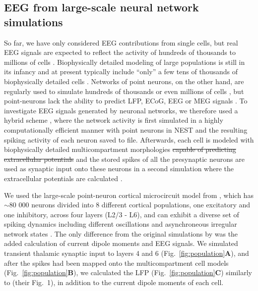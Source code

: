 \documentclass[preprint,10pt,authoryear]{elsarticle}
\newcommand{\tvntxt}[1]{{\color{Emerald}#1}}
\newcommand{\gex}[1]{{\color{Orange}#1}}
\begin{document}
\subsection{\tvntxt{EEG from large-scale neural network simulations}}
\label{subsec:populations}
So far, we have only considered EEG contributions from single cells, but real EEG signals are expected to reflect the activity of hundreds of thousands to millions of cells \citep{NUNEZ2006, COHEN2017}. 
Biophysically detailed modeling of large populations is still in its infancy \citep{EINEVOLL2019} and at present typically include ``only'' a few tens of thousands of biophysically detailed cells \citep{MARKRAM2015, BILLEH2019}. Networks of point neurons, on the other hand, are regularly used to simulate hundreds of thousands \citep{BILLEH2019} or even millions of cells \citep{SENK2018, SCHMIDT2018}, but point-neurons lack the ability to predict LFP, ECoG, EEG or MEG signals \citep{EINEVOLL2013REVIEW}.  
\gex{To investigate EEG signals generated by neuronal networks, we therefore used a hybrid} scheme \citep{HAGEN2016, SENK2018, Skaar2020}, where the network activity is first simulated in a highly computationally efficient manner with point neurons in NEST \citep{NEST} and the \gex{resulting} spiking activity of each neuron saved to file. Afterwards, each cell is modeled with biophysically detailed multicompartment morphologies \gex{\sout{capable of predicting extracellular potentials}} and the \gex{stored} spikes of all the presynaptic neurons are used as synaptic input \gex{onto these neurons in a second simulation  where the extracellular potentials are calculated} \citep{HAGEN2016, SENK2018}.

We used the large-scale point-neuron cortical microcircuit model from \cite{POTJANS2014, HAGEN2016}, which has $\sim$80 000 neurons divided into 8 different cortical populations, one excitatory and one inhibitory\gex{,} across four layers (L2/3 - L6), and can exhibit a diverse set of spiking dynamics including different oscillations and asynchroneous irregular network states \citep{HAGEN2016, BRUNEL2000}. 
The only difference from the original simulations by \cite{HAGEN2016} was the added calculation of current dipole moments \gex{and EEG signals}.
We simulated transient thalamic synaptic input to layers 4 and 6 (Fig.~\ref{fig:population}\textbf{A}), and after the spikes had been mapped onto the multicompartment cell models (Fig.~\ref{fig:population}\textbf{B}), we calculated the LFP (Fig.~\ref{fig:population}\textbf{C}) similarly to \cite{HAGEN2016} (their Fig.~1), in addition to the current dipole moments of each cell.
\end{document}
